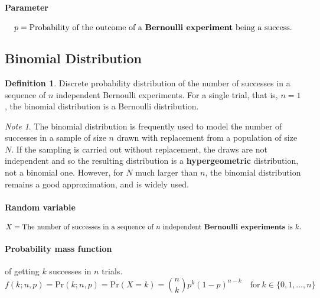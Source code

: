 \documentclass[12pt]{article}
\theoremstyle{plain}
\theoremstyle{definition}
\newtheorem{definition}{Definition}
\theoremstyle{remark}
\newtheorem*{note}{Note}
\begin{document}
\paragraph{Parameter}
\begin{equation*}
  p = \text{Probability of the outcome of a \textbf{Bernoulli experiment}
    being a success.}
\end{equation*}

\subsection{Binomial Distribution}

\begin{definition}
  Discrete probability distribution of the number of successes in a sequence of
  $n$ independent Bernoulli experiments.
  For a single trial, that is, $n=1$, the binomial distribution is a Bernoulli
  distribution.
\end{definition}

\begin{note}
  The binomial distribution is frequently used to model the number of successes
  in a sample of size $n$ drawn with replacement from a population of size
  $N$.
  If the sampling is carried out without replacement, the draws are not
  independent and so the resulting distribution is a \textbf{hypergeometric}
  distribution, not a binomial one. However, for $N$ much larger than $n$, the
  binomial distribution remains a good approximation, and is widely used.
\end{note}

\paragraph{Random variable}
\begin{equation*}
  X = \text{The number of successes in a sequence of $n$ independent
    \textbf{Bernoulli experiments} is $k$.}
\end{equation*}

\paragraph{Probability mass function} of getting $k$ successes in $n$ trials.
\begin{equation*}
  f(k;n,p) = \mathrm{Pr}(k;n,p) = \mathrm{Pr}(X=k) = \binom{n}{k}p^k(1-p)^{n-k}
  \quad \text{for}\ k \in \{0,1,\dots,n\}
\end{equation*}
\end{document}

